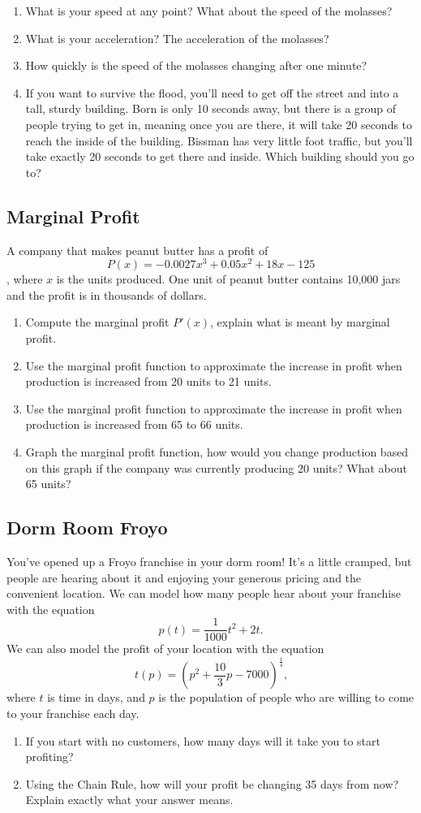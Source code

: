 \documentclass{ximera}
\begin{document}
\begin{enumerate}
\item{What is your speed at any point? What about the speed of the molasses?}
\item{What is your acceleration? The acceleration of the molasses?}
\item{How quickly is the speed of the molasses changing after one minute?}
\item{If you want to survive the flood, you'll need to get off the street and into a tall, sturdy building. Born is only 10 seconds away, but there is a group of people trying to get in, meaning once you are there, it will take 20 seconds to reach the inside of the building. Bissman has very little foot traffic, but you'll take exactly 20 seconds to get there and inside. Which building should you go to?}
\end{enumerate}


\subsection{Marginal Profit}
A company that makes peanut butter has a profit of $$P(x)=-0.0027x^3+0.05x^2+18x-125$$, where $x$ is the units produced. One unit of peanut butter contains 10,000 jars and the profit is in thousands of dollars.
\begin{enumerate}
\item{Compute the marginal profit $P'(x)$, explain what is meant by marginal profit.} 
\item{Use the marginal profit function to approximate the increase in profit when production is increased from 20 units to 21 units.}
\item{Use the marginal profit function to approximate the increase in profit when production is increased from 65 to 66 units.}
\item{Graph the marginal profit function, how would you change production based on this graph if the company was currently producing 20 units? What about 65 units?}
\end{enumerate}

\subsection{Dorm Room Froyo}
You've opened up a Froyo franchise in your dorm room! It's a little cramped, but people are hearing about it and enjoying your generous pricing and the convenient location. We can model how many people hear about your franchise with the equation $$p(t) = \frac{1}{1000}t^2 + 2t \text{.}$$ We can also model the profit of your location with the equation $$t(p) = (p^2 + \frac{10}{3}p - 7000)^{\frac{1}{4}} \text{,}$$ where $t$ is time in days, and $p$ is the population of people who are willing to come to your franchise each day.

\begin{enumerate}
\item{If you start with no customers, how many days will it take you to start profiting?}
\item{Using the Chain Rule, how will your profit be changing 35 days from now? Explain exactly what your answer means.}
\end{enumerate}
\pagebreak
\end{document}
